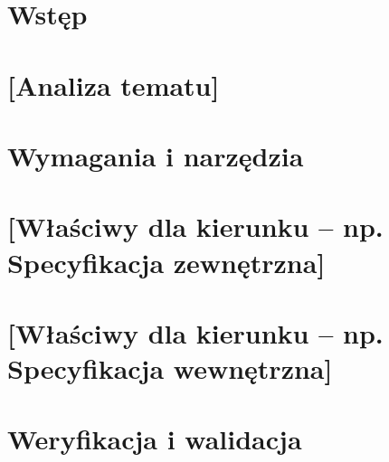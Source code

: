 \documentclass[a4paper,twoside,12pt]{book}
\begin{document}
\tableofcontents

\setcounter{stronyPozaNumeracja}{\value{page}}
\mainmatter
\pagestyle{empty}

\cleardoublepage

\pagestyle{NumeryStronNazwyRozdzialow}


\chapter{Wstęp}


\chapter{[Analiza tematu]}


\chapter{Wymagania i narzędzia}


\chapter{[Właściwy dla kierunku -- np. Specyfikacja zewnętrzna]}



\chapter{[Właściwy dla kierunku -- np. Specyfikacja wewnętrzna]}


\chapter{Weryfikacja i walidacja}

\end{document}
